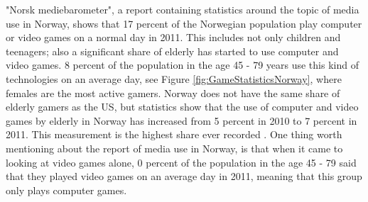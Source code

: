 "Norsk mediebarometer", a report containing statistics around the topic of media use in Norway, shows that 17 percent of the Norwegian population play computer or video games on a normal day in 2011. This includes not only children and teenagers; also a significant share of elderly has started to use computer and video games. 8 percent of the population in the age 45 - 79 years use this kind of technologies on an average day, see Figure \ref{fig:GameStatisticsNorway}, where females are the most active gamers. Norway does not have the same share of elderly gamers as the US, but statistics show that the use of computer and video games by elderly in Norway has increased from 5 percent in 2010 to 7 percent in 2011. This measurement is the highest share ever recorded \cite{ssb2010} \cite{ssb2011}. One thing worth mentioning about the report of media use in Norway, is that when it came to looking at video games alone, 0 percent of the population in the age 45 - 79 said that they played video games on an average day in 2011, meaning that this group only plays computer games. \cite{ssb2011}

